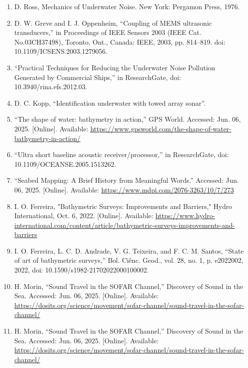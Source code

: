\documentclass{article}
\begin{document}
\begin{sloppypar}
\begin{enumerate}
    \item{D. Ross, Mechanics of Underwater Noise. New York: Pergamon Press, 1976.}

    \item{D. W. Greve and I. J. Oppenheim, “Coupling of MEMS ultrasonic transducers,” in Proceedings of IEEE Sensors 2003 (IEEE Cat. No.03CH37498), Toronto, Ont., Canada: IEEE, 2003, pp. 814–819. doi: 10.1109/ICSENS.2003.1279056.}

    \item{“Practical Techniques for Reducing the Underwater Noise Pollution Generated by Commercial Ships,” in ResearchGate, doi: 10.3940/rina.efs.2012.03.}

    \item{D. C. Kopp, “Identification underwater with towed array sonar”.}

    \item{“The shape of water: bathymetry in action,” GPS World. Accessed: Jun. 06, 2025. [Online]. Available: \url{https://www.gpsworld.com/the-shape-of-water-bathymetry-in-action/}}


    \item{“Ultra short baseline acoustic receiver/processor,” in ResearchGate, doi: 10.1109/OCEANSE.2005.1513262.}

    \item{“Seabed Mapping: A Brief History from Meaningful Words.” Accessed: Jun. 06, 2025. [Online]. Available: \url{https://www.mdpi.com/2076-3263/10/7/273}}

    \item{I. O. Ferreira, "Bathymetric Surveys: Improvements and Barriers," Hydro International, Oct. 6, 2022. [Online]. Available: \url{https://www.hydro-international.com/content/article/bathymetric-surveys-improvements-and-barriers}}

    \item{I. O. Ferreira, L. C. D. Andrade, V. G. Teixeira, and F. C. M. Santos, “State of art of bathymetric surveys,” Bol. Ciênc. Geod., vol. 28, no. 1, p. e2022002, 2022, doi: 10.1590/s1982-21702022000100002.}

    \item{H. Morin, “Sound Travel in the SOFAR Channel,” Discovery of Sound in the Sea. Accessed: Jun. 06, 2025. [Online]. Available: \url{https://dosits.org/science/movement/sofar-channel/sound-travel-in-the-sofar-channel/}}

    \item{H. Morin, “Sound Travel in the SOFAR Channel,” Discovery of Sound in the Sea. Accessed: Jun. 06, 2025. [Online]. Available: \url{https://dosits.org/science/movement/sofar-channel/sound-travel-in-the-sofar-channel/}}


\end{enumerate}
\end{sloppypar}
\end{document}
